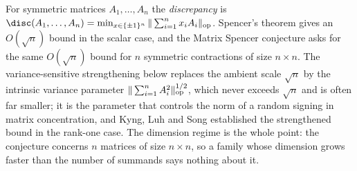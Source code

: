 For symmetric matrices $A_1,\ldots,A_n$ the \emph{discrepancy} is $\disc(A_1,\ldots,A_n)=\min_{x\in\{\pm1\}^n}\|\sum_{i=1}^nx_iA_i\|_{\rm op}$.  Spencer's theorem gives an $O(\sqrt n)$ bound in the scalar case, and the Matrix Spencer conjecture asks for the same $O(\sqrt n)$ bound for $n$ symmetric contractions of size $n\times n$.  The variance-sensitive strengthening below replaces the ambient scale $\sqrt n$ by the intrinsic variance parameter $\|\sum_{i=1}^nA_i^2\|_{\rm op}^{1/2}$, which never exceeds $\sqrt n$ and is often far smaller; it is the parameter that controls the norm of a random signing in matrix concentration, and Kyng, Luh and Song established the strengthened bound in the rank-one case.  The dimension regime is the whole point: the conjecture concerns $n$ matrices of size $n\times n$, so a family whose dimension grows faster than the number of summands says nothing about it.
